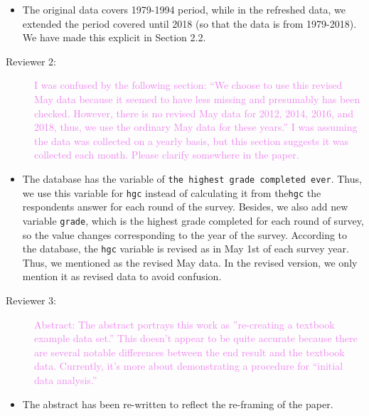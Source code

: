 \documentclass[12pt,a4paper,]{article}
\providecommand{\tightlist}{%
  \setlength{\itemsep}{0pt}\setlength{\parskip}{0pt}}
\begin{document}
\begin{itemize}
\tightlist
\item
  The original data covers 1979-1994 period, while in the refreshed data, we extended the period covered until 2018 (so that the data is from 1979-2018). We have made this explicit in Section 2.2.
\end{itemize}

\begin{description}
\item[Reviewer 2:]\textcolor{violet}{I was confused by the following section: “We choose to use this revised May data because it seemed to have less missing and presumably has been checked. However, there is no revised May data for 2012, 2014, 2016, and 2018, thus, we use the ordinary May data for these years.” I was assuming the data was collected on a yearly basis, but this section suggests it was collected each month. Please clarify somewhere in the paper.}
\end{description}

\begin{itemize}
\tightlist
\item
  The database has the variable of \texttt{the\ highest\ grade\ completed\ ever}. Thus, we use this variable for \texttt{hgc} instead of calculating it from the\texttt{hgc} the respondents answer for each round of the survey. Besides, we also add new variable \texttt{grade}, which is the highest grade completed for each round of survey, so the value changes corresponding to the year of the survey. According to the database, the \texttt{hgc} variable is revised as in May 1st of each survey year. Thus, we mentioned as the revised May data. In the revised version, we only mention it as revised data to avoid confusion.
\end{itemize}

\begin{description}
\item[Reviewer 3:]\textcolor{violet}{Abstract: The abstract portrays this work as ”re-creating a textbook example data set.” This doesn’t appear to be quite accurate because there are several notable differences between the end result and the textbook data. Currently, it’s more about demonstrating a procedure for “initial data analysis.”}
\end{description}

\begin{itemize}
\tightlist
\item
  The abstract has been re-written to reflect the re-framing of the paper.
\end{itemize}
\end{document}
